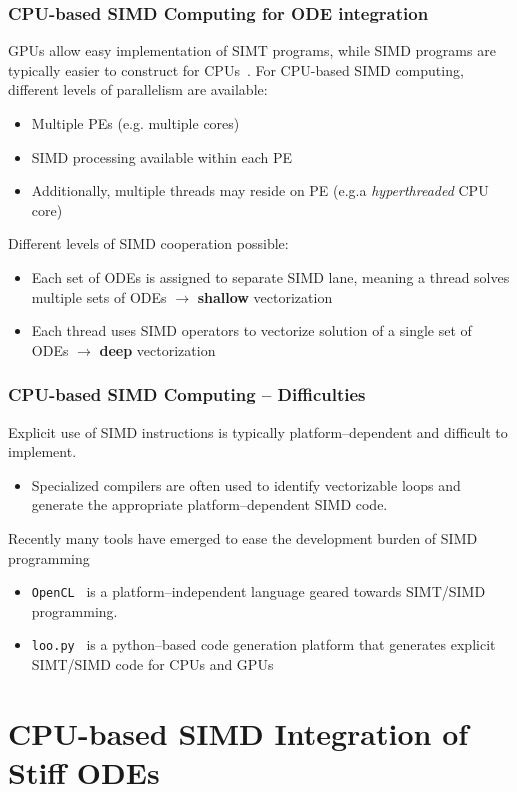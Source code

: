 \documentclass{beamer}
\begin{document}
    
\begin{frame}
 \frametitle{CPU-based SIMD Computing for ODE integration}
 GPUs allow easy implementation of SIMT programs, while SIMD programs are typically easier to construct for CPUs~.
 For CPU-based SIMD computing, different levels of parallelism are available:
 \begin{itemize}
  \item Multiple PEs (e.g. multiple cores)
  \item SIMD processing available within each PE
  \item Additionally, multiple threads may reside on PE (e.g.a \textit{hyperthreaded} CPU core)
 \end{itemize}
 Different levels of SIMD cooperation possible:
 \begin{itemize}
  \item Each set of ODEs is assigned to separate SIMD lane, meaning a thread solves multiple sets of ODEs $\rightarrow$ \textbf{shallow} vectorization
  \item Each thread uses SIMD operators to vectorize solution of a single set of ODEs $\rightarrow$ \textbf{deep} vectorization
 \end{itemize}
\end{frame}

\begin{frame}
  \frametitle{CPU-based SIMD Computing -- Difficulties}
  Explicit use of SIMD instructions is typically platform--dependent and difficult to implement.
  \begin{itemize}
   \item Specialized compilers are often used to identify vectorizable loops and generate the appropriate platform--dependent SIMD code.
  \end{itemize}
  Recently many tools have emerged to ease the development burden of SIMD programming
  \begin{itemize}
   \item \texttt{OpenCL}~ is a platform--independent language geared towards SIMT\slash SIMD programming.
   \item \texttt{loo.py}~ is a python--based code generation platform that generates explicit SIMT\slash SIMD code for CPUs and GPUs
  \end{itemize}
\end{frame}

\section{CPU-based SIMD Integration of Stiff ODEs}
\end{document}
